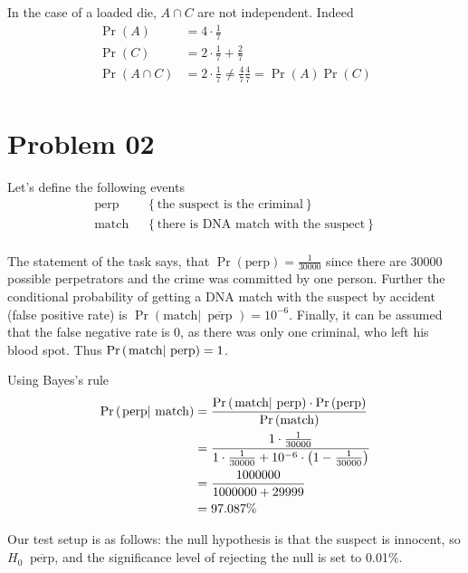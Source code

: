 \documentclass[a4paper]{article}
\newcommand{\obj}[1]{\left\{ #1 \right \}}
\newcommand{\brac}[1]{\left ( #1 \right )}
\newcommand{\induc}[1]{\left . #1 \right \vert}
\newcommand{\defn}{\mathop{\overset{\Delta}{=}}\nolimits}
\begin{document}
In the case of a loaded die, $A\cap C$ are not independent. Indeed \begin{align*}
\Pr\brac{A} &= 4\cdot \frac{1}{7}\\
\Pr\brac{C} &= 2\cdot \frac{1}{7} + \frac{2}{7}\\
\Pr\brac{A\cap C} &= 2\cdot \frac{1}{7}\neq \frac{4}{7}\frac{4}{7} =  \Pr\brac{A}\Pr\brac{C}\\ \end{align*} 


\section{Problem 02} %
\label{sec:problem_02}

Let's define the following events \begin{align*}
\text{perp}&\defn \obj{\text{the suspect is the criminal}}\\
\text{match}&\defn \obj{\text{there is DNA match with the suspect}}\\
\end{align*}

The statement of the task says, that $\Pr\brac{\text{perp}}=\frac{1}{30000}$ since there are 30000 possible perpetrators and the crime was committed by one person. Further the conditional probability of getting a DNA match with the suspect by accident (false positive rate) is
$\Pr\brac{ \induc{ \text{match} }\,\overline{ \text{ perp } } } = 10^{-6}$. Finally, it can be assumed that the false negative rate is 0, as there was only one criminal, who left his blood spot. Thus $\Pr\brac{\induc{\text{match}}\,\text{\text{perp}}} = 1$.

Using Bayes's rule \begin{align*}
\Pr\brac{\induc{\text{perp}}\,\text{match}} &= \frac{\Pr\brac{\induc{\text{match}}\,\text{\text{perp}}}\cdot\Pr\brac{\text{perp}}}{\Pr\brac{\text{match}}}\\&=\frac{1\cdot\frac{1}{30000}}{1\cdot\frac{1}{30000} + 10^{-6}\cdot \brac{1-\frac{1}{30000}}}\\&= \frac{1000000}{1000000+29999}\\&=97.087\%
\end{align*}

Our test setup is as follows: the null hypothesis is that the suspect is innocent, so $H_0\defn \overline{\text{perp}}$, and the significance level of rejecting the null is set to 0.01\%. 
\end{document}
